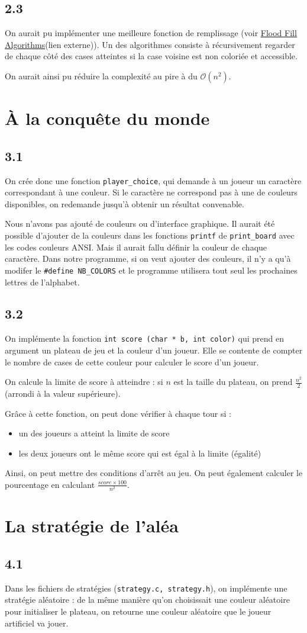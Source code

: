 \documentclass[12pt]{article}
\def\question#1{\subsection*{#1}}
\def\sec#1{\section{#1}}
\begin{document}
\question{2.3}

On aurait pu implémenter une meilleure fonction de remplissage (voir \href{https://en.wikipedia.org/wiki/Flood_fill}{Flood Fill Algorithms}(lien externe)). Un des algorithmes consiste à récursivement regarder de chaque côté des cases atteintes si la case voisine est non coloriée et accessible.

On aurait ainsi pu réduire la complexité au pire à du $\mathcal{O}(n^2)$.


\sec{À la conquête du monde}
\question{3.1}
On crée donc une fonction \texttt{player\_choice}, qui demande à un joueur un caractère correspondant à une couleur. Si le caractère ne correspond pas à une de couleurs disponibles, on redemande jusqu'à obtenir un résultat convenable.

Nous n'avons pas ajouté de couleurs ou d'interface graphique. Il aurait été possible d'ajouter de la couleurs dans les fonctions \texttt{printf} de \texttt{print\_board} avec les codes couleurs ANSI. Mais il aurait fallu définir la couleur de chaque caractère. Dans notre programme, si on veut ajouter des couleurs, il n'y a qu'à modifer le \texttt{\#define NB\_COLORS} et le programme utilisera tout seul les prochaines lettres de l'alphabet.


\question{3.2}
On implémente la fonction \texttt{int score (char * b, int color)} qui prend en argument un plateau de jeu et la couleur d'un joueur. Elle se contente de compter le nombre de cases de cette couleur pour calculer le score d'un joueur.

On calcule la limite de score à atteindre : si $n$ est la taille du plateau, on prend $\frac{n^2}{2}$ (arrondi à la valeur supérieure).

Grâce à cette fonction, on peut donc vérifier à chaque tour si :
\begin{itemize}
\item un des joueurs a atteint la limite de score
\item les deux joueurs ont le même score qui est égal à la limite (égalité)
\end{itemize}

Ainsi, on peut mettre des conditions d'arrêt au jeu.
On peut également calculer le pourcentage en calculant $\frac{score \times 100}{n^2}$.

\sec{La stratégie de l'aléa}
\question{4.1}
Dans les fichiers de stratégies (\texttt{strategy.c, strategy.h}), on implémente une stratégie aléatoire : de la même manière qu'on choisissait une couleur aléatoire pour initialiser le plateau, on retourne une couleur aléatoire que le joueur artificiel va jouer.
\end{document}
